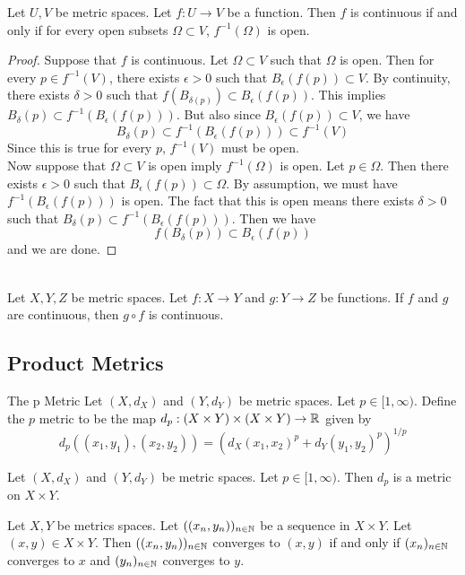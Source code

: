 \documentclass[a4paper]{article}
\begin{document}
\begin{prp}{}{} Let $U,V$ be metric spaces. Let $f:U\to V$ be a function. Then $f$ is continuous if and only if for every open subsets $\Omega\subset V$, $f^{-1}(\Omega)$ is open. 
\begin{proof} Suppose that $f$ is continuous. Let $\Omega\subset V$ such that $\Omega$ is open. Then for every $p\in f^{-1}(V)$, there exists $\epsilon>0$ such that $B_{\epsilon}(f(p))\subset V$. By continuity, there exists $\delta>0$ such that $f(B_{\delta(p)})\subset B_{\epsilon}(f(p))$. This implies $B_{\delta}(p)\subset f^{-1}(B_{\epsilon}(f(p)))$. But also since $B_{\epsilon}(f(p))\subset V$, we have $$B_{\delta}(p)\subset f^{-1}(B_{\epsilon}(f(p)))\subset f^{-1}(V)$$ Since this is true for every $p$, $f^{-1}(V)$ must be open. \\
Now suppose that $\Omega\subset V$ is open imply $f^{-1}(\Omega)$ is open. Let $p\in \Omega$. Then there exists $\epsilon>0$ such that $B_{\epsilon}(f(p))\subset\Omega$. By assumption, we must have $f^{-1}(B_{\epsilon}(f(p)))$ is open. The fact that this is open means there exists $\delta>0$ such that $B_{\delta}(p)\subset f^{-1}(B_{\epsilon}(f(p)))$. Then we have $$f(B_{\delta}(p))\subset B_{\epsilon}(f(p))$$
and we are done. 
\end{proof}
\end{prp}

\begin{prp}{}{}\\
Let $X,Y,Z$ be metric spaces. Let $f:X\to Y$ and $g:Y\to Z$ be functions. If $f$ and $g$ are continuous, then $g\circ f$ is continuous. 
\end{prp}

\subsection{Product Metrics}
\begin{defn}{The p Metric}{} Let $(X,d_X)$ and $(Y,d_Y)$ be metric spaces. Let $p\in[1,\infty)$. Define the $p$ metric to be the map $d_p:(X\times Y)\times(X\times Y)\to\mathbb{R}$ given by $$d_p((x_1,y_1),(x_2,y_2))=\left(d_X(x_1,x_2)^p+d_Y(y_1,y_2)^p\right)^{1/p}$$
\end{defn}

\begin{prp}{}{} Let $(X,d_X)$ and $(Y,d_Y)$ be metric spaces. Let $p\in[1,\infty)$. Then $d_p$ is a metric on $X\times Y$. 
\end{prp}

\begin{prp}{}{} Let $X,Y$ be metrics spaces. Let $((x_n,y_n))_{n\in\mathbb{N}}$ be a sequence in $X\times Y$. Let $(x,y)\in X\times Y$. Then $((x_n,y_n))_{n\in\mathbb{N}}$ converges to $(x,y)$ if and only if $(x_n)_{n\in\mathbb{N}}$ converges to $x$ and $(y_n)_{n\in\mathbb{N}}$ converges to $y$. 
\end{prp}
\end{document}

